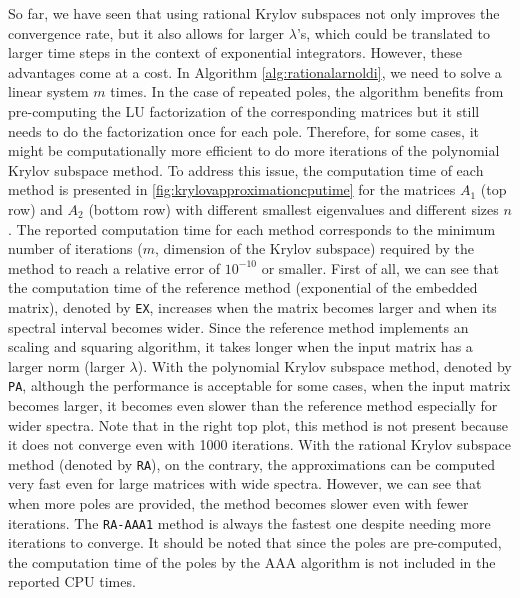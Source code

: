 So far, we have seen that using rational Krylov subspaces not only improves the convergence rate,
but it also allows for larger $\lambda$'s, which could be translated to larger time steps in
the context of exponential integrators.
However, these advantages come at a cost. In Algorithm \ref{alg:rationalarnoldi}, we need to
solve a linear system $m$ times. In the case of repeated poles, the algorithm benefits from pre-computing
the LU factorization of the corresponding matrices but it still needs to do the factorization
once for each pole. Therefore, for some cases, it might be computationally more efficient to
do more iterations of the polynomial Krylov subspace method.
To address this issue, the computation time of each method is presented in
\autoref{fig:krylovapproximationcputime} for the matrices $A_1$ (top row) and $A_2$
(bottom row) with different smallest eigenvalues and different sizes $n$.
The reported computation time for each method corresponds to the minimum number of
iterations ($m$, dimension of the Krylov subspace) required by the method to reach
a relative error of $10^{-10}$ or smaller.
First of all, we can see that the computation time of the reference method (exponential of the
embedded matrix), denoted by \texttt{EX}, increases when the matrix becomes larger and when
its spectral interval becomes wider. Since the reference method implements an scaling and squaring
algorithm, it takes longer when the input matrix has a larger norm (larger $\lambda$).
With the polynomial Krylov subspace method, denoted by \texttt{PA}, although the performance
is acceptable for some cases, when the input matrix becomes larger, it becomes even slower than
the reference method especially for wider spectra. Note that in the right top plot,
this method is not present because it does not converge even with 1000 iterations.
With the rational Krylov subspace method (denoted by \texttt{RA}), on the contrary,
the approximations can be computed very fast even for large matrices with wide spectra.
However, we can see that when more poles are provided, the method becomes slower even
with fewer iterations. The \texttt{RA-AAA1} method is always the fastest one despite
needing more iterations to converge.
It should be noted that since the poles are pre-computed, the computation time of
the poles by the AAA algorithm is not included in the reported CPU times.

